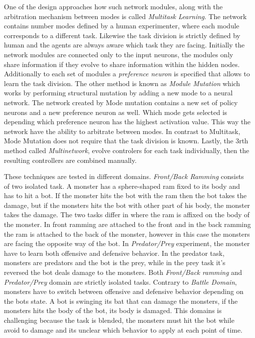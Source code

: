 \documentclass[format=acmsmall, review=false, screen=true]{acmart}
\begin{document}
One of the design approaches how such network modules, along with the arbitration mechanism between modes is called \emph{Multitask Learning}. The network contains number modes defined by a human experimenter, where each module corresponds to a different task. Likewise the task division is strictly defined by human and the agents are always aware which task they are facing. Initially the network modules are connected only to the input neurons, the modules only share information if they evolve to share information within the hidden nodes. Additionally to each set of modules a \emph{preference neuron} is specified that allows to learn the task division. The other method is known as \emph{Module Mutation} which works by performing structural mutation by adding a new mode to a neural network. The network created by Mode mutation contains a new set of policy neurons and a new preference neuron as well. Which mode gets selected is depending which preference neuron has the highest activation value. This way the network have the ability to arbitrate between modes. In contrast to Multitask, Mode Mutation does not require that the task division is known. Lastly, the 3rth method called \emph{Multinetwork}, evolve controlers for each task individually, then the resulting controllers are combined manually.

These techniques are tested in different domains. \emph{Front/Back Ramming} \cite{schrum2012evolving} consists of two isolated task. A monster has a sphere-shaped ram fixed to its body and has to hit a bot. If the monster hits the bot with the ram then the bot takes the damage, but if the monsters hits the bot with other part of his body, the monster takes the damage. The two tasks differ in where the ram is affixed on the body of the monster. In front ramming are attached to the front and in the back ramming the ram is attached to the back of the monster, however in this case the monsters are facing the opposite way of the bot. In \emph{Predator/Prey} \cite{schrum2012evolving} experiment, the monster have to learn both offensive and defensive behavior. In the predator task, monsters are predators and the bot is the prey, while in the prey task it's reversed the bot deals damage to the monsters. Both \emph{Front/Back ramming} and \emph{Predator/Prey} domain are strictly isolated tasks. Contrary to \emph{Battle Domain}, monsters have to switch between offensive and defensive behavior depending on the bots state. A bot is swinging its bat that can damage the monsters, if the monsters hits the body of the bot, its body is damaged. This domains is challenging because the task is blended, the monsters must hit the bot while avoid to damage and its unclear which behavior to apply at each point of time.
\end{document}
